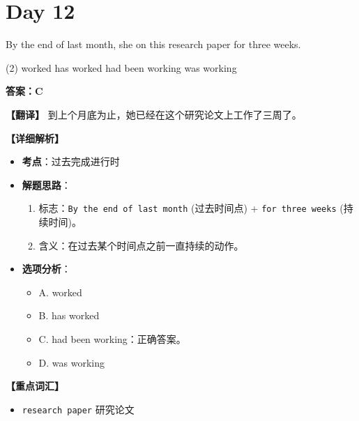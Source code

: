 \documentclass[11pt, a4paper]{article}
\newcommand{\analysis}[4]{
    \begin{solutionbox}
        \textbf{答案：#1}
        
        \textbf{【翻译】} #2
        
        \textbf{【详细解析】}
        #3
        
        \textbf{【重点词汇】}
        #4
    \end{solutionbox}
}
\newcommand{\blank}{\underline{\hspace{1.5cm}}}
\begin{document}
\section*{Day 12}
\begin{questions}
    \item By the end of last month, she \blank on this research paper for three weeks.
    \begin{tasks}(2)
        \task worked \task has worked
        \task had been working \task was working
    \end{tasks}
    \analysis{C}{到上个月底为止，她已经在这个研究论文上工作了三周了。}{
        \begin{itemize}
            \item \textbf{考点}：过去完成进行时
            \item \textbf{解题思路}：
                \begin{enumerate}
                    \item 标志：\texttt{By the end of last month} (过去时间点) + \texttt{for three weeks} (持续时间)。
                    \item 含义：在过去某个时间点之前一直持续的动作。
                \end{enumerate}
            \item \textbf{选项分析}：
                \begin{itemize}
                    \item A. worked
                    \item B. has worked
                    \item C. had been working：正确答案。
                    \item D. was working
                \end{itemize}
        \end{itemize}
    }{
        \begin{itemize}
            \item \texttt{research paper} 研究论文
        \end{itemize}
    }


\end{questions}
\end{document}
